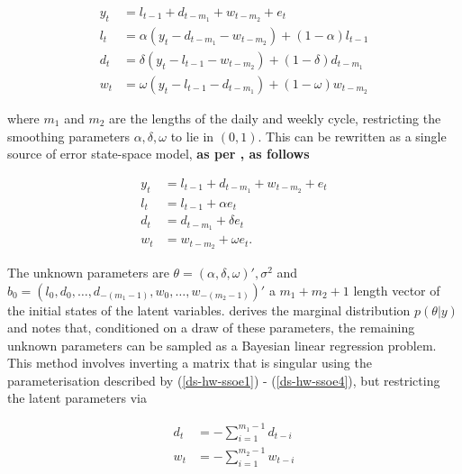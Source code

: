 \documentclass[12pt,a4paper]{article}%
\numberwithin{equation}{section}
\begin{document}
\begin{align}
y_t &= l_{t-1} + d_{t-m_1} + w_{t-m_2} + e_t \label{ds-hw1} \\
l_t &= \alpha (y_t - d_{t-m_1} - w_{t-m_2}) + (1 - \alpha)l_{t-1} \label{ds-hw2}\\
d_t &= \delta (y_t - l_{t-1} - w_{t-m_2}) + (1 - \delta)d_{t-m_1} \label{ds-hw3} \\
w_t &= \omega (y_t - l_{t-1} - d_{t-m_1}) + (1 - \omega)w_{t-m_2} \label{ds-hw4}
\end{align}

where $m_1$ and $m_2$ are the lengths of the daily and weekly cycle, restricting the smoothing parameters $\alpha, \delta, \omega$ to lie in $(0, 1)$. This can be rewritten as a single source of error state-space model, {\bf as per \citep{Snyder1985},  as follows}

\begin{align}
y_t &= l_{t-1} + d_{t-m_1} + w_{t-m_2} + e_t \label{ds-hw-ssoe1} \\
l_t &= l_{t-1} + \alpha e_t \label{ds-hw-ssoe2} \\
d_t &= d_{t-m_1} + \delta e_t \label{ds-hw-ssoe3} \\
w_t &= w_{t-m_2} + \omega e_t \label{ds-hw-ssoe4}. 
\end{align}

The unknown parameters are $\theta = (\alpha, \delta, \omega)', \sigma^2$ and $b_0 = (l_0, d_0, \dots, d_{-(m_1 - 1)}, w_0, \dots, w_{-(m_2 - 1)})'$ a $m_1 + m_2 + 1$ length vector of the initial states of the latent variables. 
\citet{Forbes2000} derives the marginal distribution $p(\theta | y)$ and notes that, conditioned on a draw of these parameters, the remaining unknown parameters can be sampled as a Bayesian linear regression problem. This method involves inverting a matrix that is singular using the parameterisation described by (\ref{ds-hw-ssoe1}) - (\ref{ds-hw-ssoe4}), but restricting the latent parameters via

\begin{align}
d_t &= - \sum_{i=1}^{m_1-1} d_{t-i} \\
w_t &= - \sum_{i=1}^{m_2-1} w_{t-i}
\end{align}
\end{document}
